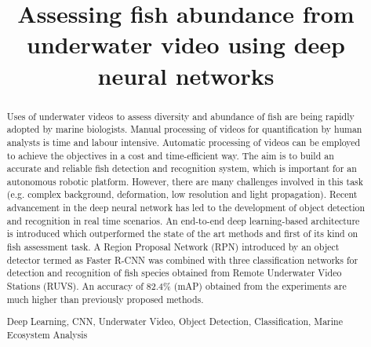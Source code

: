 \documentclass[conference]{IEEEtran}       %
\begin{document}
\title{Assessing fish abundance from underwater video using deep neural networks}

\author{

}
\maketitle


\begin{abstract}
Uses of underwater videos to assess diversity and abundance of fish are being rapidly adopted by marine biologists. Manual processing of videos for quantification by human analysts is time and labour intensive. Automatic processing of videos can be employed to achieve the objectives in a cost and time-efficient way. The aim is to build an accurate and reliable fish detection and recognition system, which is important for an autonomous robotic platform. However, there are many challenges involved in this task (e.g. complex background, deformation, low resolution and light propagation). Recent advancement in the deep neural network has led to the development of object detection and recognition in real time scenarios. An end-to-end deep learning-based architecture is introduced which outperformed the state of the art methods and first of its kind on fish assessment task. A Region Proposal Network (RPN) introduced by an object detector termed as Faster R-CNN was combined with three classification networks for detection and recognition of fish species obtained from Remote Underwater Video Stations (RUVS). An accuracy of 82.4\% (mAP) obtained from the experiments are much higher than previously proposed methods.

\begin{IEEEkeywords}
Deep Learning, CNN, Underwater Video, Object Detection, Classification, Marine Ecosystem Analysis
\end{IEEEkeywords}

\end{abstract}
 \vspace{-1ex}
\end{document}
